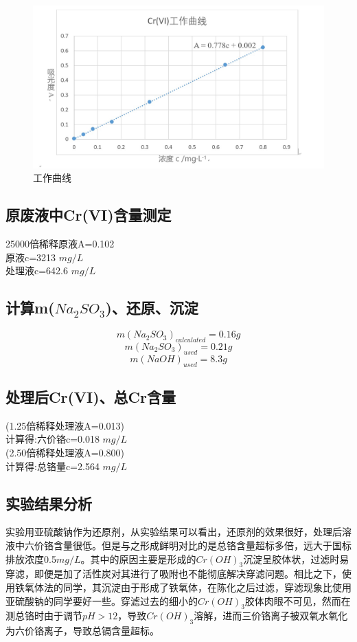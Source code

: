\documentclass[UTF8,a4paper,11pt,twocolumn]{ctexart}
\begin{document}
\begin{figure}[h]
\centering
\includegraphics[scale=0.6]{gz.jpg}
\caption{工作曲线}
\end{figure}

\subsection{原废液中Cr(VI)含量测定}
\begin{center}
25000倍稀释原液\space A=0.102\\原液\space c=3213 $mg/L$\\处理液\space c=642.6 $mg/L$
\end{center}
\subsection{计算m($Na_2SO_3$)、还原、沉淀}
$$m(Na_2SO_3)_{calculated}=0.16g$$
$$m(Na_2SO_3)_{used}=0.21g$$
$$m(NaOH)_{used}=8.3g$$
\subsection{处理后Cr(VI)、总Cr含量}
\begin{center}
(1.25倍稀释处理液\space A=0.013)\\计算得:六价铬\space c=0.018 $mg/L$\\
(2.50倍稀释处理液\space A=0.800)\\计算得:总铬量\space c=2.564 $mg/L$
\end{center}
\subsection{实验结果分析}
实验用亚硫酸钠作为还原剂，从实验结果可以看出，还原剂的效果很好，处理后溶液中六价铬含量很低。但是与之形成鲜明对比的是总铬含量超标多倍，远大于国标排放浓度0.5$mg/L$。其中的原因主要是形成的$Cr(OH)_3$沉淀呈胶体状，过滤时易穿滤，即便是加了活性炭对其进行了吸附也不能彻底解决穿滤问题。相比之下，使用铁氧体法的同学，其沉淀由于形成了铁氧体，在陈化之后过滤，穿滤现象比使用亚硫酸钠的同学要好一些。穿滤过去的细小的$Cr(OH)_3$胶体肉眼不可见，然而在测总铬时由于调节$pH>12$，导致$Cr(OH)_3$溶解，进而三价铬离子被双氧水氧化为六价铬离子，导致总镉含量超标。
\end{document}
